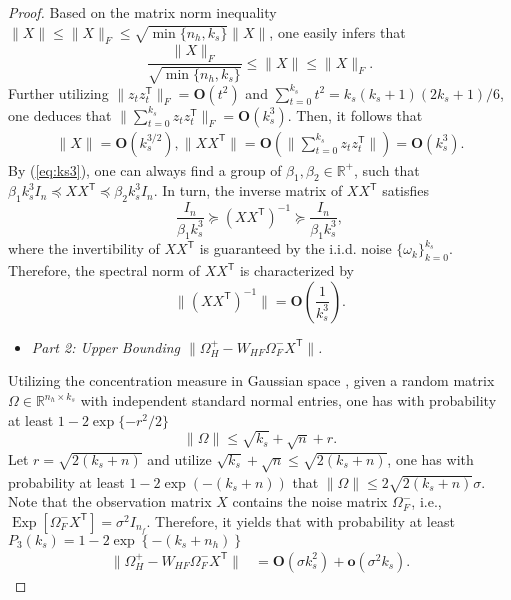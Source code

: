 \documentclass[12pt,journal,draftclsnofoot,onecolumn]{IEEEtran}
\let \sss=\scriptscriptstyle
\begin{document}
\begin{proof}
Based on the matrix norm inequality $\|X\|\le \|X\|_{F}\le \sqrt{\min\{n_h,k_s\}}\|X\|$, one easily infers that
\begin{equation}
\frac{\|X\|_{F}}{\sqrt{\min\{n_h,k_s\}}} \le \|X\| \le \|X\|_{F}. 
\end{equation}
Further utilizing $\| z_{t} z_{t}^\mathsf{T} \|_{F}=\bm{O}( t^2)$ and $\sum\nolimits_{t=0}^{k_s} t^2= k_s(k_s+1)(2k_s+1)/6$, one deduces that $ \| \sum\nolimits_{t=0}^{k_s} z_{t} z_{t}^\mathsf{T} \|_{F}= \bm{O}( k_s^3)$. 
Then, it follows that 
\begin{align}\label{eq:ks3}
\| X \| \!=\! \bm{O}( k_s^{3/2}), \| X X^\mathsf{T}\| \!=\! \bm{O}( \| \sum\limits_{t=0}^{k_s} z_{t} z_{t}^\mathsf{T} \| ) \!=\! \bm{O}( k_s^3). 
\end{align}
By (\ref{eq:ks3}), one can always find a group of $\beta_1, \beta_2\in\mathbb{R}^{+}$, such that $\beta_1 k_s^3 I_{n} \preceq X X^\mathsf{T}  \preceq \beta_2 k_s^3 I_{n}$. 
In turn, the inverse matrix of $X X^\mathsf{T}$ satisfies
\begin{equation}
\frac{I_{n} }{\beta_1 k_s^3} \succeq (X X^\mathsf{T})^{-1} \succeq \frac{I_{n}}{\beta_1 k_s^3}, 
\end{equation}
where the invertibility of $X X^\mathsf{T}$ is guaranteed by the i.i.d. noise $\{\omega_k\}_{k=0}^{k_s}$. 
Therefore, the spectral norm of $X X^\mathsf{T}$ is characterized by 
\begin{equation}\label{eq:yy-bound}
\| (XX^\mathsf{T})^{-1}  \|=\bm{O}(\frac{1}{k_s^3}). 
\end{equation}

\begin{itemize}
\item \textit{Part 2: Upper Bounding $\| \Omega_{\sss H}^{+} - W_{\sss HF} \Omega_{\sss F}^{-} X^\mathsf{T} \|$. }
\end{itemize}
Utilizing the concentration measure in Gaussian space \cite{davidson2001local}, given a random matrix $\Omega\in \mathbb{R}^{n_h \times k_s}$ with independent standard normal entries, one has with probability at least $1-2 \exp \{-r^{2} / 2 \}$ 
\begin{equation}
\| \Omega  \| \leq \sqrt{k_s}+\sqrt{n}+r. 
\end{equation}
Let $r=\sqrt{2(k_s+n)}$ and utilize $\sqrt{k_s}+\sqrt{n}\le \sqrt{2(k_s+n)}$, one has with probability at least $1-2 \exp \left(-(k_s+n)\right)$ that $\| \Omega\| \leq 2\sqrt{2(k_s+n)} \sigma$. 
Note that the observation matrix $X$ contains the noise matrix $\Omega_{\sss F}^{-}$, i.e., $\operatorname{Exp}[\Omega_{\sss F}^{-}X^\mathsf{T}]=\sigma^2 I_{n_f}$. 
Therefore, it yields that with probability at least $P_3(k_s)=1-2 \exp \left\{-(k_s+n_h)\right\}$
\begin{align}\label{eq:oo-bound}
\| \Omega_{\sss H}^{+} - W_{\sss HF} \Omega_{\sss F}^{-} X^\mathsf{T} \| &=\bm{O}(\sigma k_s^{ 2}) + \bm{o}( \sigma^2 {k_s}). 
\end{align}


\end{proof}
\end{document}
